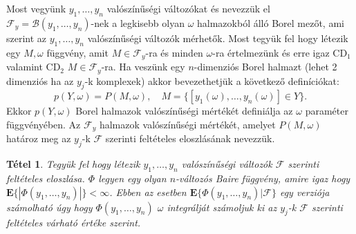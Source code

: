 \documentclass{article}
\newtheorem{theorem}{Tétel}
\begin{document}
Most vegyünk $y_1,\ldots,y_n$ valószínűségi változókat és nevezzük el $\mathscr{F}_y = \mathscr{B} (y_1,\ldots,y_n)$-nek a legkisebb olyan $\omega$ halmazokból álló Borel mezőt, ami szerint az $y_1,\ldots,y_n$ valószínűségi változók mérhetők. Most tegyük fel hogy létezik egy $M,\omega$ függvény, amit $M \in \mathscr{F}_y$-ra és minden $\omega$-ra értelmezünk és erre igaz CD$_1$ valamint CD$_2$ $M \in \mathscr{F}_y$-ra.
Ha veszünk egy $n$-dimenziós Borel halmazt (lehet 2 dimenziós ha az $y_j$-k komplexek) akkor bevezethetjük a következő definíciókat: 
\[
 p(Y,\omega) = P(M,\omega), \quad M = \{[y_1(\omega),\ldots,y_n(\omega)] \in Y \}.
\]
Ekkor $p(Y,\omega)$ Borel halmazok valószínűségi mértékét definiálja az $\omega$ paraméter függvényében. Az $\mathscr{F}_y$ halmazok valószínűségi mértékét, amelyet $P(M,\omega)$ határoz meg az $y_j$-k $\mathscr{F}$ szerinti feltételes eloszlásának nevezzük. 
\begin{theorem}\label{th:t9-2}
	Tegyük fel hogy létezik $y_1,\ldots,y_n$ valószínűségi változók $\mathscr{F}$ szerinti feltételes eloszlása. $\Phi$ legyen egy olyan $n$-változós Baire függvény, amire igaz hogy $\mathrm{\textbf{E}}\{|\Phi(y_1,\ldots,y_n)|\} < \infty$. Ebben az esetben $\mathrm{\textbf{E}}\{\Phi(y_1,\ldots,y_n) | \mathscr{F} \}$ egy verziója számolható úgy hogy $\Phi(y_1,\ldots,y_n)$ $\omega$ integrálját számoljuk ki az $y_j$-k $\mathscr{F}$ szerinti feltételes várható értéke szerint. 
\end{theorem}
\end{document}
